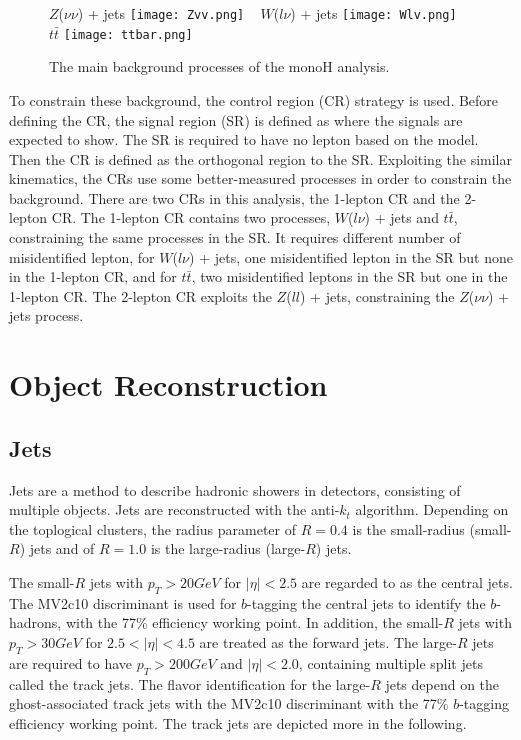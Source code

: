 \documentclass[class=NTHU_thesis, crop=false]{standalone}
\begin{document}
\begin{figure}[!hbt]
	\captionsetup[subfigure]{labelformat=empty}
	\centering
	\subcaptionbox
	{$Z$($\nu\nu$) + jets
		\label{fig:subfig_fig1}}
	{\texttt{[image: Zvv.png]}}
	~
	\subcaptionbox
	{$W$($l\nu$) + jets
		\label{fig:subfig_fig2}}
	{\texttt{[image: Wlv.png]}}
	~
	\subcaptionbox
	{$t\bar{t}$
		\label{fig:subfig_fig3}}
	{\texttt{[image: ttbar.png]}}
	\caption{The main background processes of the monoH analysis.}
	\label{fig:label}
\end{figure}

To constrain these background, the control region (CR) strategy is used. Before defining the CR, the signal region (SR) is defined as where the signals are expected to show. The SR is required to have no lepton based on the model. Then the CR is defined as the orthogonal region to the SR. Exploiting the similar kinematics, the CRs use some better-measured processes in order to constrain the background. There are two CRs in this analysis, the 1-lepton CR and the 2-lepton CR. The 1-lepton CR contains two processes, $W$($l\nu$) + jets and $t\bar{t}$, constraining the same processes in the SR. It requires different number of misidentified lepton, for $W$($l\nu$) + jets, one misidentified lepton in the SR but none in the 1-lepton CR, and for $t\bar{t}$, two misidentified leptons in the SR but one in the 1-lepton CR. The 2-lepton CR exploits the $Z$($ll$) + jets, constraining the $Z$($\nu\nu$) + jets process.

\section{Object Reconstruction}
\subsection{Jets}
Jets are a method to describe hadronic showers in detectors, consisting of multiple objects. Jets are reconstructed with the anti-$k_t$ algorithm. Depending on the toplogical clusters, the radius parameter of $R = 0.4$ is the small-radius (small-$R$) jets and of $R = 1.0$ is the large-radius (large-$R$) jets.

The small-$R$ jets with $p_T > 20 GeV$ for $\left|\eta\right| < 2.5$ are regarded to as the central jets. The MV2c10 discriminant is used for $b$-tagging the central jets to identify the $b$-hadrons, with the 77\% efficiency working point. In addition, the small-$R$ jets with $p_T > 30 GeV$ for $2.5 < \left|\eta\right| < 4.5$ are treated as the forward jets. The large-$R$ jets are required to have $p_T > 200 GeV$ and $\left|\eta\right| < 2.0$, containing multiple split jets called the track jets. The flavor identification for the large-$R$ jets depend on the ghost-associated track jets with the MV2c10 discriminant with the 77\% $b$-tagging efficiency working point. The track jets are depicted more in the following.
\end{document}
